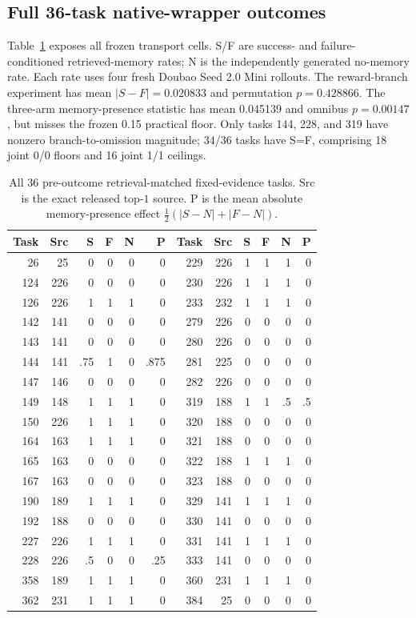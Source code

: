 \subsection{Full 36-task native-wrapper outcomes}
Table~\ref{tab:native-36} exposes all frozen transport cells. S/F are success- and failure-conditioned retrieved-memory rates; N is the independently generated no-memory rate. Each rate uses four fresh Doubao Seed 2.0 Mini rollouts. The reward-branch experiment has mean $|S-F|=0.020833$ and permutation $p=0.428866$. The three-arm memory-presence statistic has mean 0.045139 and omnibus $p=0.00147$, but misses the frozen 0.15 practical floor. Only tasks 144, 228, and 319 have nonzero branch-to-omission magnitude; 34/36 tasks have S=F, comprising 18 joint 0/0 floors and 16 joint 1/1 ceilings.

\begin{table}[h]
\centering
\scriptsize
\caption{All 36 pre-outcome retrieval-matched fixed-evidence tasks. Src is the exact released top-$1$ source. P is the mean absolute memory-presence effect $\frac12(|S-N|+|F-N|)$.}
\label{tab:native-36}
\begin{tabular}{rrrrrr@{\qquad}rrrrrr}
\toprule
Task & Src & S & F & N & P & Task & Src & S & F & N & P \\
\midrule
26  & 25  & 0 & 0 & 0 & 0 & 229 & 226 & 1 & 1 & 1 & 0 \\
124 & 226 & 0 & 0 & 0 & 0 & 230 & 226 & 1 & 1 & 1 & 0 \\
126 & 226 & 1 & 1 & 1 & 0 & 233 & 232 & 1 & 1 & 1 & 0 \\
142 & 141 & 0 & 0 & 0 & 0 & 279 & 226 & 0 & 0 & 0 & 0 \\
143 & 141 & 0 & 0 & 0 & 0 & 280 & 226 & 0 & 0 & 0 & 0 \\
144 & 141 & .75 & 1 & 0 & .875 & 281 & 225 & 0 & 0 & 0 & 0 \\
147 & 146 & 0 & 0 & 0 & 0 & 282 & 226 & 0 & 0 & 0 & 0 \\
149 & 148 & 1 & 1 & 1 & 0 & 319 & 188 & 1 & 1 & .5 & .5 \\
150 & 226 & 1 & 1 & 1 & 0 & 320 & 188 & 0 & 0 & 0 & 0 \\
164 & 163 & 1 & 1 & 1 & 0 & 321 & 188 & 0 & 0 & 0 & 0 \\
165 & 163 & 0 & 0 & 0 & 0 & 322 & 188 & 1 & 1 & 1 & 0 \\
167 & 163 & 0 & 0 & 0 & 0 & 323 & 188 & 0 & 0 & 0 & 0 \\
190 & 189 & 1 & 1 & 1 & 0 & 329 & 141 & 1 & 1 & 1 & 0 \\
192 & 188 & 0 & 0 & 0 & 0 & 330 & 141 & 0 & 0 & 0 & 0 \\
227 & 226 & 1 & 1 & 1 & 0 & 331 & 141 & 1 & 1 & 1 & 0 \\
228 & 226 & .5 & 0 & 0 & .25 & 333 & 141 & 0 & 0 & 0 & 0 \\
358 & 189 & 1 & 1 & 1 & 0 & 360 & 231 & 1 & 1 & 1 & 0 \\
362 & 231 & 1 & 1 & 1 & 0 & 384 & 25 & 0 & 0 & 0 & 0 \\
\bottomrule
\end{tabular}
\end{table}

